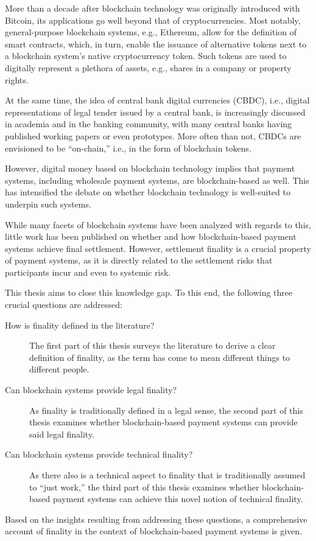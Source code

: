 More than a decade after blockchain technology was originally introduced with Bitcoin, its applications go well beyond that of cryptocurrencies.
Most notably, general-purpose blockchain systems, e.g., Ethereum, allow for the definition of smart contracts, which, in turn, enable the issuance of alternative tokens next to a blockchain system's native cryptocurrency token.
Such tokens are used to digitally represent a plethora of assets, e.g., shares in a company or property rights.

At the same time, the idea of central bank digital currencies (CBDC), i.e., digital representations of legal tender issued by a central bank, is increasingly discussed in academia and in the banking community, with many central banks having published working papers or even prototypes.
More often than not, CBDCs are envisioned to be ``on-chain,'' i.e., in the form of blockchain tokens.

However, digital money based on blockchain technology implies that payment systems, including wholesale payment systems, are blockchain-based as well.
This has intensified the debate on whether blockchain technology is well-suited to underpin such systems.

While many facets of blockchain systems have been analyzed with regards to this, little work has been published on whether and how blockchain-based payment systems achieve final settlement.
However, settlement finality is a crucial property of payment systems, as it is directly related to the settlement risks that participants incur and even to systemic risk.

This thesis aims to close this knowledge gap.
To this end, the following three crucial questions are addressed:

\begin{description}
	\item[How is finality defined in the literature?]
		The first part of this thesis surveys the literature to derive a clear definition of finality, as the term has come to mean different things to different people.
	\item[Can blockchain systems provide legal finality?]
		As finality is traditionally defined in a legal sense, the second part of this thesis examines whether blockchain-based payment systems can provide said legal finality.
	\item[Can blockchain systems provide technical finality?]
		As there also is a technical aspect to finality that is traditionally assumed to ``just work,'' the third part of this thesis examines whether blockchain-based payment systems can achieve this novel notion of technical finality.
\end{description}

Based on the insights resulting from addressing these questions, a comprehensive account of finality in the context of blockchain-based payment systems is given.
